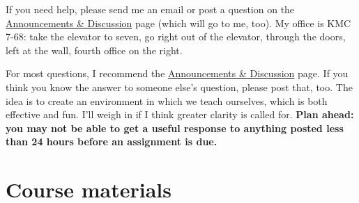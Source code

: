 \documentclass[12pt]{article}
\begin{document}
If you need help, please send me an email or post a question
on the
\href{https://sites.google.com/site/nyusternglobal/home/announcements}{Announcements \& Discussion}
page (which will go to me, too).
My office is KMC 7-68:
take the elevator to seven,
go right out of the elevator, through the doors, left at the wall, fourth office on the right.

For most questions, I recommend the
\href{https://sites.google.com/site/nyusternglobal/home/announcements}{Announcements \& Discussion}
page.
If you think you know the answer to someone else's question, please post that, too.
The idea is to create an environment in which we teach ourselves,
which is both effective and fun.
I'll weigh in if I think greater clarity is called for.
{\bf Plan ahead:  you may not be able to get a useful response to anything posted
less than 24 hours before an assignment is due.}


\section{Course materials}
\end{document}

